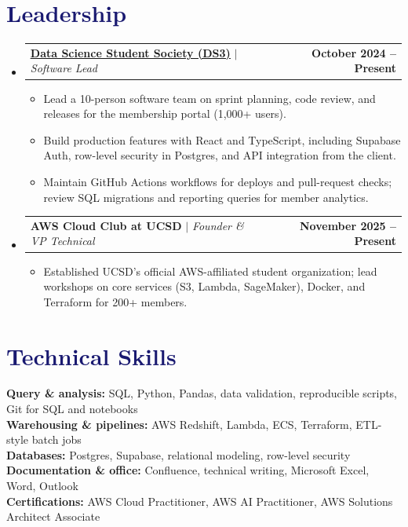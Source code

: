\documentclass[letterpaper,11pt]{article}
\makeatletter
\newcommand{\resumeItem}[1]{
  \item\small{
    {#1 \vspace{-2pt}}
  }
}
\newcommand{\resumeProjectHeading}[2]{
    \item
    \begin{tabular*}{1.001\textwidth}{l@{\extracolsep{\fill}}r}
      \small#1 & \textbf{\small #2}\\
    \end{tabular*}\vspace{-7pt}
}
\newcommand{\resumeSubHeadingListStart}{\begin{itemize}[leftmargin=0.0in, label={}]}
\newcommand{\resumeSubHeadingListEnd}{\end{itemize}}
\newcommand{\resumeItemListStart}{\begin{itemize}}
\newcommand{\resumeItemListEnd}{\end{itemize}\vspace{-5pt}}
\newcommand\accentColor{MidnightBlue}
\makeatother
\begin{document}
\section{\textcolor{\accentColor}{Leadership}}
\vspace{-7pt}
\resumeSubHeadingListStart
\resumeProjectHeading{\textbf{\href{https://www.ds3atucsd.com/}{\underline{Data Science Student Society (DS3)}}} $|$ \emph{Software Lead}}{October 2024 -- Present}
\resumeItemListStart
\resumeItem{Lead a 10-person software team on sprint planning, code review, and releases for the membership portal (1,000+ users).}
\resumeItem{Build production features with React and TypeScript, including Supabase Auth, row-level security in Postgres, and API integration from the client.}
\resumeItem{Maintain GitHub Actions workflows for deploys and pull-request checks; review SQL migrations and reporting queries for member analytics.}
\resumeItemListEnd
\vspace{-15pt}
\resumeProjectHeading{\textbf{AWS Cloud Club at UCSD} $|$ \emph{Founder \& VP Technical}}{November 2025 -- Present}
\resumeItemListStart
\resumeItem{Established UCSD's official AWS-affiliated student organization; lead workshops on core services (S3, Lambda, SageMaker), Docker, and Terraform for 200+ members.}
\resumeItemListEnd
\resumeSubHeadingListEnd
\vspace{-15pt}

\section{\textcolor{\accentColor}{Technical Skills}}
\begin{itemize}[leftmargin=0.15in, label={}]
  \small{\item{
        \textbf{Query \& analysis: }{SQL, Python, Pandas, data validation, reproducible scripts, Git for SQL and notebooks} \\
        \textbf{Warehousing \& pipelines: }{AWS Redshift, Lambda, ECS, Terraform, ETL-style batch jobs} \\
        \textbf{Databases: }{Postgres, Supabase, relational modeling, row-level security} \\
        \textbf{Documentation \& office: }{Confluence, technical writing, Microsoft Excel, Word, Outlook} \\
        \textbf{Certifications: }{AWS Cloud Practitioner, AWS AI Practitioner, AWS Solutions Architect Associate}
        }}
\end{itemize}
\vspace{-10pt}
\end{document}
